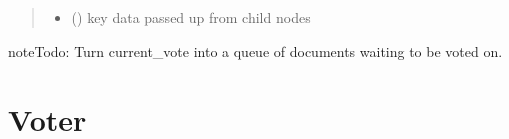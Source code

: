\documentclass[letterpaper,10pt,english]{sphinxmanual}
\begin{document}
\begin{fulllineitems}
\begin{fulllineitems}
\begin{quote}
\begin{description}
\begin{itemize}
\item {} 
 (\sphinxstyleliteralemphasis{, }) \textendash{} key data passed up from child nodes

\end{itemize}

\end{description}\end{quote}

\begin{sphinxadmonition}{note}{Todo:}
Turn current\_vote into a queue of documents waiting to be voted on.
\end{sphinxadmonition}

\end{fulllineitems}


\end{fulllineitems}

\label{\detokenize{index:module-Voter}}

\chapter{Voter}
\label{\detokenize{index:voter}}
\end{document}
